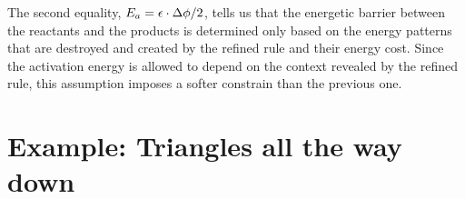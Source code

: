 The second equality, $E_a = \epsilon \cdot \Delta\phi/2$,
tells us that the energetic barrier between
the reactants and the products is determined
only based on the energy patterns
that are destroyed and created by the refined rule %
and their energy cost.
Since the activation energy is allowed to depend
on the context revealed by the refined rule,
this assumption imposes a softer constrain
than the previous one.




\section{Example: Triangles all the way down}
\label{sec:triangles}

